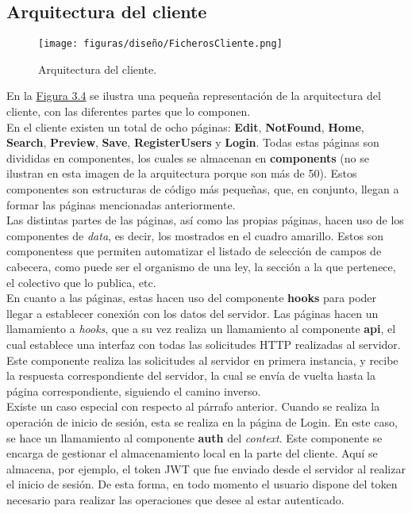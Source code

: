 \subsection{Arquitectura del cliente}

\begin{figure}[H]
\centerline{\texttt{[image: figuras/diseño/FicherosCliente.png]}}
\caption{Arquitectura del cliente.}
\label{enlaceArquitecturaCliente}
\end{figure}

En la \hyperref[enlaceArquitecturaCliente]{Figura 3.4} se ilustra una pequeña representación de la arquitectura del cliente, con las diferentes partes que lo componen.
\\

En el cliente existen un total de ocho páginas: {\bf Edit}, {\bf NotFound}, {\bf Home}, {\bf Search}, {\bf Preview}, {\bf Save}, {\bf RegisterUsers} y {\bf Login}. Todas estas páginas son divididas en componentes, los cuales se almacenan en {\bf components} (no se ilustran en esta imagen de la arquitectura porque son más de 50). Estos componentes son estructuras de código más pequeñas, que, en conjunto, llegan a formar las páginas mencionadas anteriormente.
\\

Las distintas partes de las páginas, así como las propias páginas, hacen uso de los componentes de {\it data}, es decir, los mostrados en el cuadro amarillo. Estos son componentess que permiten automatizar el listado de selección de campos de cabecera, como puede ser el organismo de una ley, la sección a la que pertenece, el colectivo que lo publica, etc.
\\

En cuanto a las páginas, estas hacen uso del componente {\bf hooks} para poder llegar a establecer conexión con los datos del servidor. Las páginas hacen un llamamiento a {\it hooks}, que a su vez realiza un llamamiento al componente {\bf api}, el cual establece una interfaz con todas las solicitudes HTTP realizadas al servidor. Este componente realiza las solicitudes al servidor en primera instancia, y recibe la respuesta correspondiente del servidor, la cual se envía de vuelta hasta la página correspondiente, siguiendo el camino inverso.
\\

Existe un caso especial con respecto al párrafo anterior. Cuando se realiza la operación de inicio de sesión, esta se realiza en la página de Login. En este caso, se hace un llamamiento al componente {\bf auth} del {\it context}. Este componente se encarga de gestionar el almacenamiento local en la parte del cliente. Aquí se almacena, por ejemplo, el token JWT que fue enviado desde el servidor al realizar el inicio de sesión. De esta forma, en todo momento el usuario dispone del token necesario para realizar las operaciones que desee al estar autenticado.
